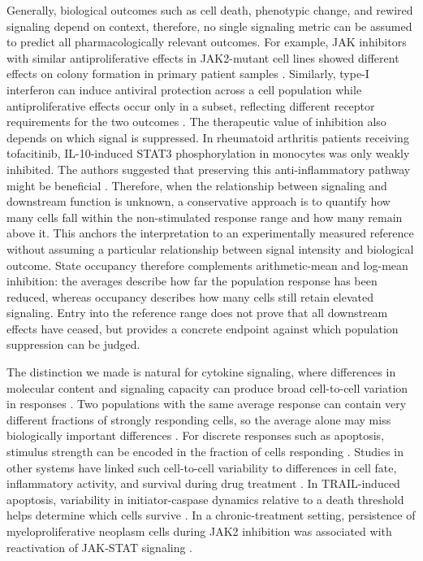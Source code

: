 \documentclass[11pt]{article}
\begin{document}
Generally, biological outcomes such as cell death, phenotypic change, and rewired signaling depend on context, therefore, no single signaling metric can be assumed to predict all pharmacologically relevant outcomes. For example, JAK inhibitors with similar antiproliferative effects in JAK2-mutant cell lines showed different effects on colony formation in primary patient samples \citep{kong2023comprehensive}. Similarly, type-I interferon can induce antiviral protection across a cell population while antiproliferative effects occur only in a subset, reflecting different receptor requirements for the two outcomes \citep{levin2011stochastic}. The therapeutic value of inhibition also depends on which signal is suppressed. In rheumatoid arthritis patients receiving tofacitinib, IL-10-induced STAT3 phosphorylation in monocytes was only weakly inhibited. The authors suggested that preserving this anti-inflammatory pathway might be beneficial \citep{palmroth2021tofacitinib}. Therefore, when the relationship between signaling and downstream function is unknown, a conservative approach is to quantify how many cells fall within the non-stimulated response range and how many remain above it. This anchors the interpretation to an experimentally measured reference without assuming a particular relationship between signal intensity and biological outcome. State occupancy therefore complements arithmetic-mean and log-mean inhibition: the averages describe how far the population response has been reduced, whereas occupancy describes how many cells still retain elevated signaling. Entry into the reference range does not prove that all downstream effects have ceased, but provides a concrete endpoint against which population suppression can be judged.


The distinction we made is natural for cytokine signaling, where differences in molecular content and signaling capacity can produce broad cell-to-cell variation in responses \citep{topolewski2021information,Billing2019Robustness,topolewski2022phenotypic,adlung2021cell}. Two populations with the same average response can contain very different fractions of strongly responding cells, so the average alone may miss biologically important differences \citep{niepel2009non,altschuler2010cellular}. For discrete responses such as apoptosis, stimulus strength can be encoded in the fraction of cells responding \citep{suderman2017fundamental}. Studies in other systems have linked such cell-to-cell variability to differences in cell fate, inflammatory activity, and survival during drug treatment \citep{satija2014heterogeneity,spencer2009non,pu2023drug,bonsignore2025linking}. In TRAIL-induced apoptosis, variability in initiator-caspase dynamics relative to a death threshold helps determine which cells survive \citep{roux2015fractional}. In a chronic-treatment setting, persistence of myeloproliferative neoplasm cells during JAK2 inhibition was associated with reactivation of JAK-STAT signaling \citep{koppikar2012heterodimeric}.
\end{document}
